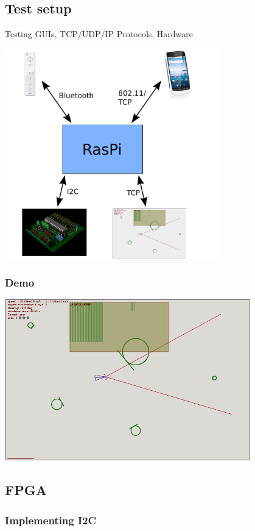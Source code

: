 \documentclass[pdf]{beamer}
\begin{document}
\subsection{Test setup}
\begin{frame}
Testing GUIs, TCP/UDP/IP Protocols, Hardware
  \begin{center}
  \includegraphics[width = 0.7\textwidth]{pics/raw/software2.pdf}
  \end{center}
\end{frame}
\begin{frame}
\frametitle{Demo}
  \begin{center}
  \includegraphics[width = 0.8\textwidth]{pics/raw/sim.png}
  \end{center}
\end{frame}
\subsection{FPGA}
\begin{frame}
\frametitle{Implementing I2C}
\end{frame}
\end{document}
